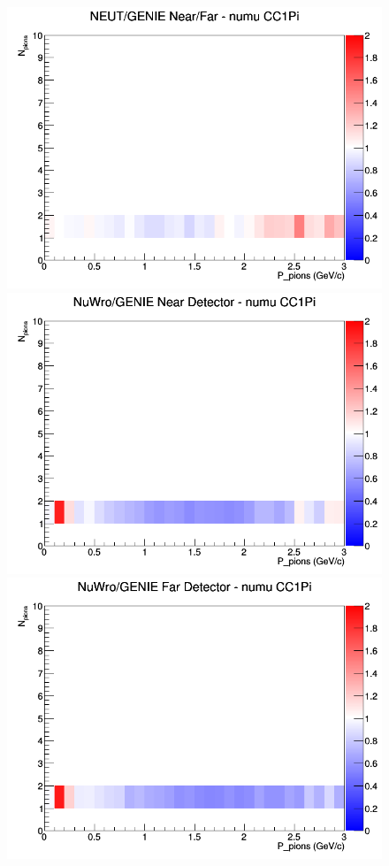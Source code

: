 \documentclass[12pt]{article}
\begin{document}
\begin{figure}[h]
\endminipage
{}
\includegraphics[width=\linewidth]{N_P/nominal/pions/ratios/CC1Pi_NEUT_GENIE_numu_NF_N_P.png}
\endminipage
\newline
{}
\includegraphics[width=\linewidth]{N_P/nominal/pions/ratios/CC1Pi_NuWro_GENIE_numu_near_N_P.png}
\endminipage
{}
\includegraphics[width=\linewidth]{N_P/nominal/pions/ratios/CC1Pi_NuWro_GENIE_numu_far_N_P.png}

\end{figure}
\end{document}
